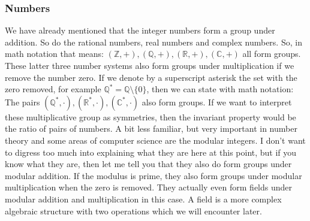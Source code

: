 \subsubsection{Numbers}
We have already mentioned that the integer numbers form a group under addition. So do the rational numbers, real numbers and complex numbers. So, in math notation that means:  $(\mathbb{Z}, +), (\mathbb{Q}, +), (\mathbb{R}, +), (\mathbb{C}, +)$ all form groups. These latter three number systems also form groups under multiplication if we remove the number zero. If we denote by a superscript asterisk the set with the zero removed, for example $\mathbb{Q}^{\ast} = \mathbb{Q} \setminus \{0\}$, then we can state with math notation: The pairs $(\mathbb{Q}^{\ast}, \cdot), (\mathbb{R}^{\ast}, \cdot), (\mathbb{C}^{\ast}, \cdot)$ also form groups. If we want to interpret these multiplicative group as symmetries, then the invariant property would be the ratio of pairs of numbers. A bit less familiar, but very important in number theory and some areas of computer science are the modular integers. I don't want to digress too much into explaining what they are here at this point, but if you know what they are, then let me tell you that they also do form groups under modular addition. If the modulus is prime, they also form groups under modular multiplication when the zero is removed. They actually even form fields under modular addition and multiplication in this case. A field is a more complex algebraic structure with two operations which we will encounter later. %

